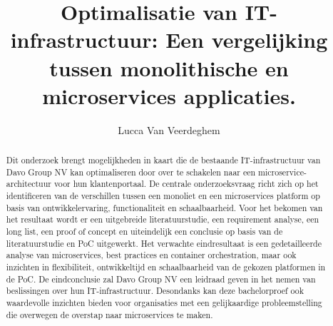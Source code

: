 \documentclass{hogent-article}
\title{Optimalisatie van IT-infrastructuur: Een vergelijking tussen monolithische en microservices applicaties.}
\author{Lucca Van Veerdeghem}
\begin{document}
\begin{abstract}
Dit onderzoek brengt mogelijkheden in kaart die de bestaande IT-infrastructuur van Davo Group NV kan optimaliseren door over te schakelen naar een microservice-architectuur voor hun klantenportaal. De centrale onderzoeksvraag richt zich op het identificeren van de verschillen tussen een monoliet en een microservices platform op basis van ontwikkelervaring, functionaliteit en schaalbaarheid. Voor het bekomen van het resultaat wordt er een uitgebreide literatuurstudie, een requirement analyse, een long list, een proof of concept en uiteindelijk een conclusie op basis van de literatuurstudie en PoC uitgewerkt. Het verwachte eindresultaat is een gedetailleerde analyse van microservices, best practices en container orchestration, maar ook inzichten in flexibiliteit, ontwikkeltijd en schaalbaarheid van de gekozen platformen in de PoC. De eindconclusie zal Davo Group NV een leidraad geven in het nemen van beslissingen over hun IT-infrastructuur. Desondanks kan deze bachelorproef ook waardevolle inzichten bieden voor organisaties met een gelijkaardige probleemstelling die overwegen de overstap naar microservices te maken.
    
\end{abstract}

\tableofcontents



\printbibliography[heading=bibintoc]
\end{document}
